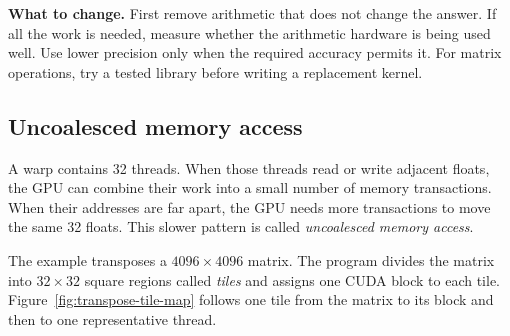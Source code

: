 \documentclass[11pt]{article}
\numberwithin{equation}{section}
\numberwithin{figure}{section}
\numberwithin{table}{section}
\begin{document}
\textbf{What to change.}
First remove arithmetic that does not change the answer.  If all the work is needed,
measure whether the arithmetic hardware is being used well.  Use lower precision
only when the required accuracy permits it.  For matrix operations, try a tested
library before writing a replacement kernel.

\subsection{Uncoalesced memory access}

A warp contains 32 threads.  When those threads read or write adjacent floats, the
GPU can combine their work into a small number of memory transactions.  When their
addresses are far apart, the GPU needs more transactions to move the same 32
floats.  This slower pattern is called \emph{uncoalesced memory access}.

The example transposes a $4096\times4096$ matrix.  The program divides the matrix
into $32\times32$ square regions called \emph{tiles} and assigns one CUDA block to
each tile.  Figure~\ref{fig:transpose-tile-map} follows one tile from the matrix to
its block and then to one representative thread.
\end{document}

